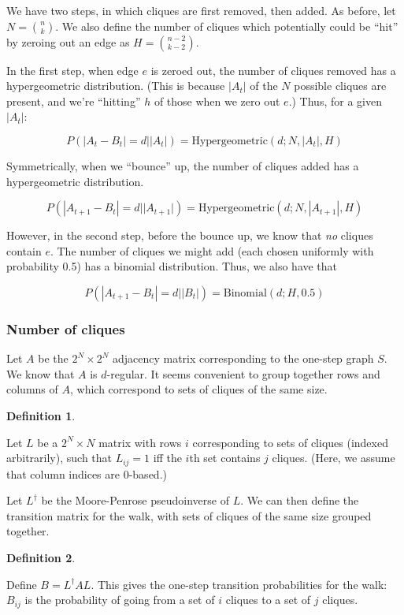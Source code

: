 \documentclass[12pt]{article}
\theoremstyle{definition}
\newtheorem{defn}{Definition}[section]
\begin{document}
We have two steps, in which cliques are first removed, then added.
As before, let $N = {n \choose k}$.
We also define the number of cliques which potentially could be ``hit'' by
zeroing out an edge as $H = {{n-2} \choose {k-2}}$.

In the first step, when edge $e$ is zeroed out, the number of cliques removed has
a hypergeometric distribution. (This is because $|A_t|$ of the $N$ possible cliques
are present, and we're ``hitting'' $h$ of those when we zero out $e$.)
Thus, for a given $|A_t|$:

\[
P(|A_t - B_t|=d||A_t|) = \text{Hypergeometric}(d; N, |A_t|, H)
\]

Symmetrically, when we ``bounce'' up, the number of cliques added has
a hypergeometric distribution.

\[
P(|A_{t+1} - B_t|=d||A_{t+1}|) = \text{Hypergeometric}(d; N, |A_{t+1}|, H)
\]

However, in the second step, before the bounce up, we know that {\em no} cliques contain $e$. The number of
cliques we might add (each chosen uniformly with probability 0.5) has 
a binomial distribution. Thus, we also have that

\[
P(|A_{t+1} - B_t|=d||B_t|) = \text{Binomial}(d; H, 0.5)
\]

\subsubsection{Number of cliques}

Let $A$ be the $2^N{\times}2^N$ adjacency matrix corresponding to the one-step graph $S$.
We know that $A$ is $d$-regular.
It seems convenient to group together rows and columns of $A$,
which correspond to sets of cliques of the same size.

\begin{defn} \label{defn:levels}

Let $L$ be a $2^N{\times}N$ matrix with rows $i$ corresponding to sets of cliques (indexed arbitrarily), such that
$L_{ij} = 1$ iff the $i$th set contains $j$ cliques. (Here, we assume that column indices are 0-based.)

\end{defn}

Let $L^{\dagger}$ be the Moore-Penrose pseudoinverse of $L$.
We can then define the transition matrix for the walk, with sets of cliques of the same size grouped together.

\begin{defn} \label{defn:B}

Define
$B = L^{\dagger}AL$. This gives the one-step transition probabilities for the walk: $B_{ij}$ is the
probability of going from a set of $i$ cliques to a set of $j$ cliques.

\end{defn}
\end{document}

